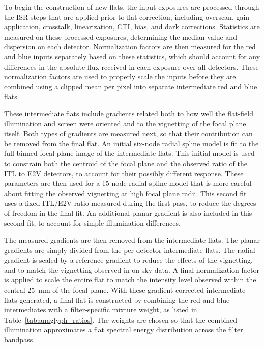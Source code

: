 To begin the construction of new flats, the input exposures are processed through the ISR steps that are applied prior to flat correction, including overscan, gain application, crosstalk, linearization, CTI, bias, and dark corrections.
Statistics are measured on these processed exposures, determining the median value and dispersion on each detector.
Normalization factors are then measured for the red and blue inputs separately based on these statistics, which should account for any differences in the absolute flux received in each exposure over all detectors.
These normalization factors are used to properly scale the inputs before they are combined using a clipped mean per pixel into separate intermediate red and blue flats.

These intermediate flats include gradients related both to how well the flat-field illumination and screen were oriented and to the vignetting of the focal plane itself. 
Both types of gradients are measured next, so that their contribution can be removed from the final flat.
An initial six-node radial spline model is fit to the full binned focal plane image of the intermediate flats.
This initial model is used to constrain both the centroid of the focal plane and the observed ratio of the ITL to E2V detectors, to account for their possibly different response.
These parameters are then used for a 15-node radial spline model that is more careful about fitting the observed vignetting at high focal plane radii.
This second fit uses a fixed ITL/E2V ratio measured during the first pass, to reduce the degrees of freedom in the final fit.
An additional planar gradient is also included in this second fit, to account for simple illumination differences.

The measured gradients are then removed from the intermediate flats.
The planar gradients are simply divided from the per-detector intermediate flats.
The radial gradient is scaled by a reference gradient to reduce the effects of the vignetting, and to match the vignetting observed in on-sky data.
A final normalization factor is applied to scale the entire flat to match the intensity level observed within the central 25~mm of the focal plane.
With these gradient-corrected intermediate flats generated, a final flat is constructed by combining the red and blue intermediates with a filter-specific mixture weight, as listed in Table~\ref{tab:anaglyph_ratios}.
The weights are chosen so that the combined illumination approximates a flat spectral energy distribution across the filter bandpass.

